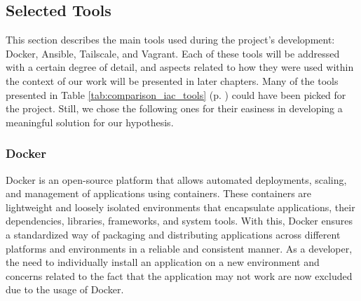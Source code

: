 \begin{table}[H]
  \caption{Comparison of Popular Infrastructure as Code Tools \cite{unleashing_full_potential_of_ansible_ref}.}
  \label{tab:comparison_iac_tools}
\end{table}

\subsection{Selected Tools} \label{sec:selected_tools}

This section describes the main tools used during the project's development: Docker, Ansible, Tailscale, and Vagrant. Each of these tools will be addressed with a certain degree of detail, and aspects related to how they were used within the context of our work will be presented in later chapters. Many of the tools presented in Table \ref{tab:comparison_iac_tools} (p. \pageref{tab:comparison_iac_tools}) could have been picked for the project. Still, we chose the following ones for their easiness in developing a meaningful solution for our hypothesis.

\subsubsection{Docker} \label{sec:selected_tools_docker}

Docker is an open-source platform that allows automated deployments, scaling, and management of applications using containers. These containers are lightweight and loosely isolated environments that encapsulate applications, their dependencies, libraries, frameworks, and system tools. With this, Docker ensures a standardized way of packaging and distributing applications across different platforms and environments in a reliable and consistent manner. As a developer, the need to individually install an application on a new environment and concerns related to the fact that the application may not work are now excluded due to the usage of Docker. 

